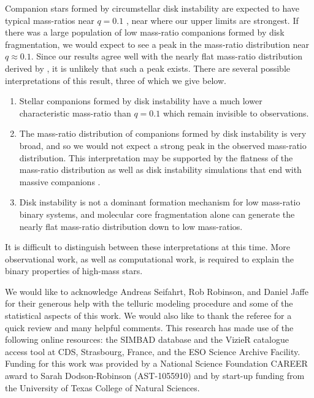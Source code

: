 Companion stars formed by circumstellar disk instability are expected to have
typical mass-ratios near $q = 0.1$ \citep{Kratter2006,
  Stamatellos2011}, near where our upper limits are strongest. If there was
a large population of low mass-ratio companions formed by disk
fragmentation, we would expect to see a peak in the mass-ratio
distribution near $q \approx 0.1$. Since our results agree well with
the nearly flat mass-ratio distribution derived by \cite{Sana2012}, it
is unlikely that such a peak exists. There are several possible
interpretations of this result, three of which we give below.

\begin{enumerate}
\item Stellar companions formed by disk instability have a much lower
  characteristic mass-ratio than $q=0.1$ which remain invisible to
  observations.
\item The mass-ratio distribution of companions formed by disk
  instability is very broad, and so we would not expect a strong peak
  in the observed mass-ratio distribution. This interpretation may be
  supported by the flatness of the mass-ratio distribution as well as
  disk instability simulations that end with massive companions
  \citep[e.g.][]{Krumholz2009, Clarke2009}.
\item Disk instability is not a dominant formation mechanism for low
  mass-ratio binary systems, and molecular core fragmentation alone
  can generate the nearly flat mass-ratio distribution down to low mass-ratios.
\end{enumerate}

It is difficult to distinguish between these interpretations at this
time. More observational work, as well as computational work, is
required to explain the binary properties of high-mass stars. 

We would like to acknowledge Andreas Seifahrt, Rob Robinson, and Daniel Jaffe for their generous help with the telluric modeling 
procedure and some of the statistical aspects of this work. We would
also like to thank the referee for a quick review and many helpful comments. This 
research has made use of the 
following online resources: the SIMBAD database and the VizieR
catalogue access tool at CDS, Strasbourg, France, and the ESO Science 
Archive Facility. Funding for this work was provided by a National Science Foundation CAREER award to Sarah Dodson-Robinson (AST-1055910) and by start-up funding from the University of Texas College of Natural Sciences.


